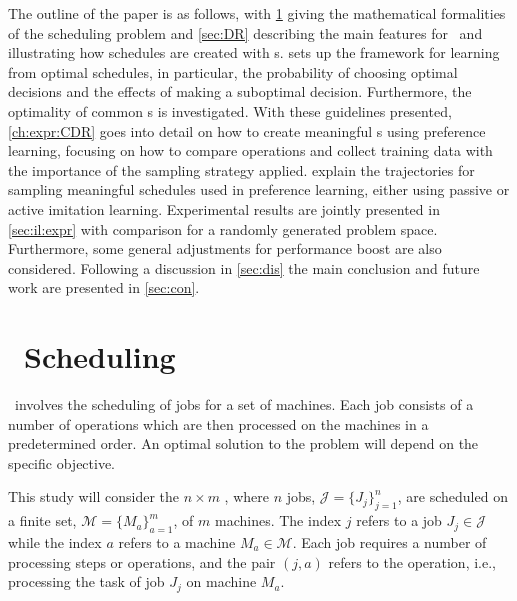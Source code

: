 \documentclass[twocolumn]{svjour3}
\begin{document}
The outline of the paper is as follows, with \cref{sec:problemdef} giving the 
mathematical formalities of the scheduling problem and 
\cref{sec:DR} describing the main features for \jsp\ 
and illustrating how schedules are created with \dr s. 
 sets up the framework for learning from optimal schedules,  
in particular, the probability of choosing optimal decisions and the effects of 
making a suboptimal decision. Furthermore, the optimality of common \sdr s is 
investigated.
With these guidelines presented, \cref{ch:expr:CDR} goes into detail on how to 
create 
meaningful \cdr s using preference learning, focusing on how to 
compare operations and collect training data with the importance of  the
sampling strategy applied. 
 explain the trajectories for 
sampling meaningful schedules used in preference learning, either 
using passive or active imitation learning. 
Experimental results are jointly presented in \cref{sec:il:expr} with 
comparison for a randomly generated problem space. 
Furthermore, some general adjustments for performance boost are also considered.
Following a discussion in \cref{sec:dis} the main conclusion and future work are presented in \cref{sec:con}.

\section{\Jsp~Scheduling}\label{sec:problemdef}
\JSP\ involves the scheduling of jobs for a set of 
machines. Each job consists of a number of operations which are then processed 
on the machines in a predetermined order. An optimal solution to the problem 
will depend on the specific objective. 

This study will consider the $n\times m$ \JSP, where $n$ jobs, 
$\mathcal{J}=\{J_j\}_{j=1}^n$, are scheduled on a finite set, 
$\mathcal{M}=\{M_a\}_{a=1}^m$, of $m$ machines. The index $j$ refers to a job 
$J_j\in\mathcal{J}$ while the index $a$ refers to a machine 
$M_a\in\mathcal{M}$. 
Each job requires a number of processing steps or operations, and the pair 
$(j,a)$ refers to the operation, i.e., processing the task of job $J_j$ on 
machine $M_a$. 
\end{document}
